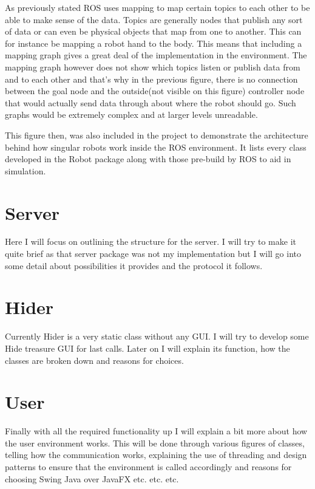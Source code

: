 \documentclass{report}
\begin{document}
        As previously stated ROS uses mapping to map certain topics to each other to be able to make sense of the data. Topics are generally nodes that publish any sort of data or can even be physical objects that map from one to another. This can for instance be mapping a robot hand to the body. This means that including a mapping graph gives a great deal of the implementation in the environment. The mapping graph however does not show which topics listen or publish data from and to each other and that's why in the previous figure, there is no connection between the goal node and the outside(not visible on this figure) controller node that would actually send data through about where the robot should go. Such graphs would be extremely complex and at larger levels unreadable.

        This figure then, was also included in the project to demonstrate the architecture behind how singular robots work inside the ROS environment. It lists every class developed in the Robot package along with those pre-build by ROS to aid in simulation.
        



    \section{Server}
      Here I will focus on outlining the structure for the server. I will try to make it quite brief as that server package was not my implementation but I will go into some detail about possibilities it provides and the protocol it follows.

    \section{Hider}
      Currently Hider is a very static class without any GUI. I will try to develop some Hide treasure GUI for last calls. Later on I will explain its function, how the classes are broken down and reasons for choices.

    \section{User}
      Finally with all the required functionality up I will explain a bit more about how the user environment works. This will be done through various figures of classes, telling how the communication works, explaining the use of threading and design patterns to ensure that the environment is called accordingly and reasons for choosing Swing Java over JavaFX etc. etc. etc.
\end{document}
